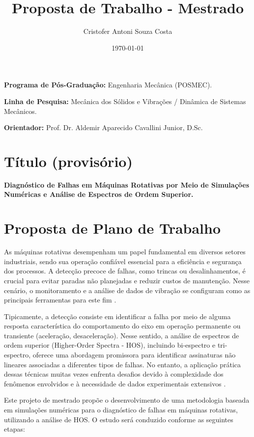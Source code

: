 \documentclass[12pt, a4paper]{article}
\begin{document}
\title{Proposta de Trabalho - Mestrado}
\author{Cristofer Antoni Souza Costa}
\date{\today}

\maketitle

\textbf{Programa de Pós-Graduação:} Engenharia Mecânica (POSMEC).

\textbf{Linha de Pesquisa:} Mecânica dos Sólidos e Vibrações / Dinâmica de Sistemas Mecânicos.

\textbf{Orientador:} Prof. Dr. Aldemir Aparecido Cavallini Junior, D.Sc.

\section*{Título (provisório)}

\textbf{Diagnóstico de Falhas em Máquinas Rotativas por Meio de Simulações Numéricas e Análise de Espectros de Ordem Superior.}

\section*{Proposta de Plano de Trabalho}
As máquinas rotativas desempenham um papel fundamental em diversos setores industriais, sendo sua operação confiável essencial para a eficiência e segurança dos processos. A detecção precoce de falhas, como trincas ou desalinhamentos, é crucial para evitar paradas não planejadas e reduzir custos de manutenção. Nesse cenário, o monitoramento e a análise de dados de vibração se configuram como as principais ferramentas para este fim \citep{muszynska_rotordynamics_2005}.

Tipicamente, a detecção consiste em identificar a falha por meio de alguma resposta característica do comportamento do eixo em operação permanente ou transiente (aceleração, desaceleração). Nesse sentido, a análise de espectros de ordem superior (Higher-Order Spectra - HOS), incluindo bi-espectro e tri-espectro, oferece uma abordagem promissora para identificar assinaturas não lineares associadas a diferentes tipos de falhas. No entanto, a aplicação prática dessas técnicas muitas vezes enfrenta desafios devido à complexidade dos fenômenos envolvidos e à necessidade de dados experimentais extensivos \citep{sinha_higher_2007}.

Este projeto de mestrado propõe o desenvolvimento de uma metodologia baseada em simulações numéricas para o diagnóstico de falhas em máquinas rotativas, utilizando a análise de HOS. O estudo será conduzido conforme as seguintes etapas:
\end{document}
